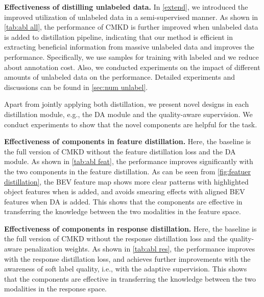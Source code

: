 \documentclass[runningheads]{llncs}
\begin{document}
\noindent\textbf{Effectiveness of distilling unlabeled data.}
In \cref{extend}, we introduced the improved utilization of unlabeled data in a semi-supervised manner. 
As shown in \cref{tab:abl all}, the performance of CMKD is further improved when unlabeled data is added to distillation pipeline, indicating that our method is efficient in extracting beneficial information from massive unlabeled data and improves the performance.
Specifically, we use  samples for training with  labeled and we reduce about  annotation cost.
Also, we conducted experiments on the impact of different amounts of unlabeled data on the performance. 
Detailed experiments and discussions can be found in \cref{sec:num unlabel}.


Apart from jointly applying both distillation, we present novel designs in each distillation module, e.g., the DA module and the quality-aware supervision. We conduct experiments to show that the novel components are helpful for the task.

\noindent\textbf{Effectiveness of components in feature distillation.}
Here, the baseline is the full version of CMKD without the feature distillation loss  and the DA module.
As shown in \cref{tab:abl feat}, the performance improves significantly with the two components in the feature distillation. 
As can be seen from \cref{fig:featuer distillation}, the BEV feature map shows more clear patterns with highlighted object features when  is added, and avoids smearing effects with aligned BEV features when DA is added.
This shows that the components are effective in transferring the knowledge between the two modalities in the feature space.

\noindent\textbf{Effectiveness of components in response distillation.}
Here, the baseline is the full version of CMKD without the response distillation loss  and the quality-aware penalization weights.
As shown in \cref{tab:abl res}, the performance improves with the response distillation loss,
and achieves further improvements with the awareness of soft label quality, i.e., with the adaptive supervision.
This shows that the components are effective in transferring the knowledge between the two modalities in the response space.
\end{document}
